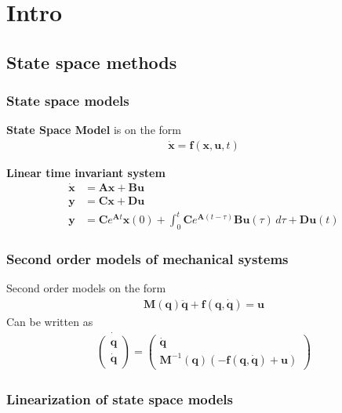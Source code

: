 \section{Intro}

\setcounter{subsection}{1}
\subsection{State space methods}
\subsubsection{State space models} %
\textbf{State Space Model} is on the form
\begin{align*}
    \dot{\bm{x}} = \bm{f}(\bm{x},\bm{u},t)
\end{align*}

\textbf{Linear time invariant system}
\begin{align*}
    \dot{\bm{x}} &= \bm{Ax}+\bm{Bu} \\
    \bm{y} &= \bm{Cx + Du} \\
    \bm{y} &= \bm{C}e^{\bm{A}t}\bm{x}(0) + \int_0^t\bm{C}e^{\bm{A}(t-\tau)}\bm{B}\bm{u}(\tau)\,d\tau+\bm{D}\bm{u}(t)
\end{align*}

\subsubsection{Second order models of mechanical systems} %
Second order models on the form
\begin{align*}
    \bm{M}(\bm{q})\bm{\ddot{q}} + \bm{f}(\bm{q},\bm{\dot{q}}) = \bm{u}
\end{align*}
Can be written as
\begin{align*}
    \dot{\begin{pmatrix}
        \bm{q} \\ \bm{\dot{q}}
    \end{pmatrix}} = \begin{pmatrix}
        \bm{\dot{q}} \\  \bm{M}^{-1}(\bm{q})(-\bm{f}(\bm{q},\bm{\dot{q}})+\bm{u})
    \end{pmatrix}
\end{align*}
\subsubsection{Linearization of state space models} %

